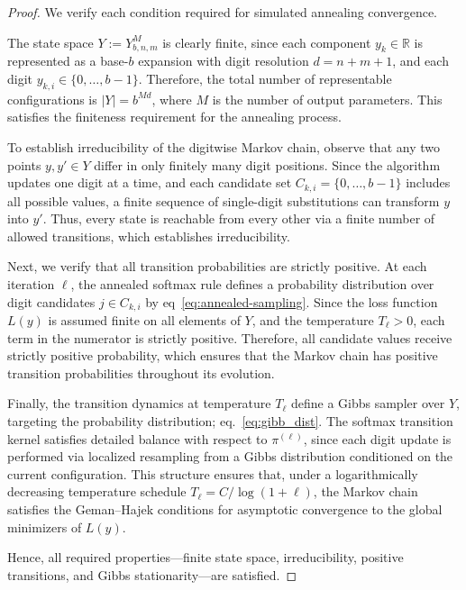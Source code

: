 \documentclass[aps,twocolumn,superscriptaddress,nofootinbib]{revtex4}
\begin{document}
\begin{proof}
We verify each condition required for simulated annealing convergence.

The state space \( Y := Y_{b,n,m}^M \) is clearly finite, since each component \( y_k \in \mathbb{R} \) is represented as a base-\( b \) expansion with digit resolution \( d = n + m + 1 \), and each digit \( y_{k,i} \in \{0, \dots, b-1\} \). Therefore, the total number of representable configurations is \( |Y| = b^{Md} \), where \( M \) is the number of output parameters. This satisfies the finiteness requirement for the annealing process.

To establish irreducibility of the digitwise Markov chain, observe that any two points \( y, y' \in Y \) differ in only finitely many digit positions. Since the algorithm updates one digit at a time, and each candidate set \( C_{k,i} = \{0, \dots, b-1\} \) includes all possible values, a finite sequence of single-digit substitutions can transform \( y \) into \( y' \). Thus, every state is reachable from every other via a finite number of allowed transitions, which establishes irreducibility.

Next, we verify that all transition probabilities are strictly positive. At each iteration \( \ell \), the annealed softmax rule defines a probability distribution over digit candidates \( j \in C_{k,i} \) by eq~\eqref{eq:annealed-sampling}. Since the loss function \( L(y) \) is assumed finite on all elements of \( Y \), and the temperature \( T_\ell > 0 \), each term in the numerator is strictly positive. Therefore, all candidate values receive strictly positive probability, which ensures that the Markov chain has positive transition probabilities throughout its evolution.

Finally, the transition dynamics at temperature \( T_\ell \) define a Gibbs sampler over \( Y \), targeting the probability distribution; eq.~\eqref{eq:gibb_dist}. The softmax transition kernel satisfies detailed balance with respect to \( \pi^{(\ell)} \), since each digit update is performed via localized resampling from a Gibbs distribution conditioned on the current configuration. This structure ensures that, under a logarithmically decreasing temperature schedule \( T_\ell = C / \log(1 + \ell) \), the Markov chain satisfies the Geman–Hajek conditions for asymptotic convergence to the global minimizers of \( L(y) \).

Hence, all required properties—finite state space, irreducibility, positive transitions, and Gibbs stationarity—are satisfied.
\end{proof}
\end{document}
